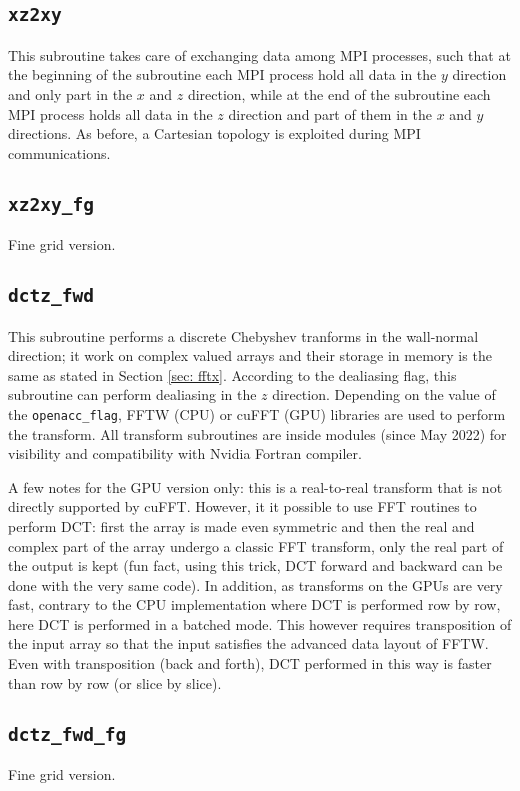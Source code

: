 \subsection{\texttt{xz2xy}}
This subroutine takes care of exchanging data among MPI processes, such that at the beginning of the subroutine each MPI process hold all data in the $y$ direction and only part in the $x$ and $z$ direction, while at the end of the subroutine each MPI process holds all data in the $z$ direction and part of them in the $x$ and $y$ directions. As before, a Cartesian topology is exploited during MPI communications.

\subsection{\texttt{xz2xy\_fg}}
Fine grid version.

\subsection{\texttt{dctz\_fwd}}
This subroutine performs a discrete Chebyshev tranforms in the wall-normal direction; it work on complex valued arrays and their storage in memory is the same as stated in Section \ref{sec: fftx}. 
According to the dealiasing flag, this subroutine can perform dealiasing in the $z$ direction.
Depending on the value of the \texttt{openacc\_flag}, FFTW (CPU) or cuFFT (GPU) libraries are used to perform the transform.
All transform subroutines are inside modules (since May 2022) for visibility and compatibility with Nvidia Fortran compiler.

A few notes for the GPU version only: this is a real-to-real transform that is not directly supported by cuFFT. 
However, it it possible to use FFT routines to perform DCT: first the array is made even symmetric and then the real and complex part of the array undergo a classic FFT transform, only the real part of the output is kept (fun fact, using this trick, DCT forward and backward can be done with the very same code).
In addition, as transforms on the GPUs are very fast, contrary to the CPU implementation where DCT is performed row by row, here DCT is performed in a batched mode. 
This however requires transposition of the input array so that the input satisfies the advanced data layout of FFTW.
Even with transposition (back and forth), DCT performed in this way is faster than row by row (or slice by slice). 

\subsection{\texttt{dctz\_fwd\_fg}}
Fine grid version.


